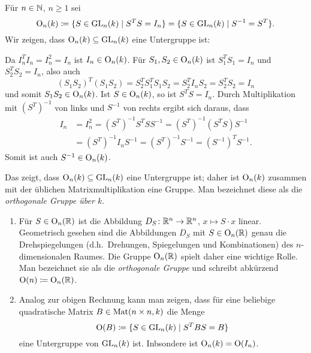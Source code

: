 Für $n \in \mathbb{N}$, $n \geq 1$ sei
\[
 \mathrm{O}_n(k)
 \coloneqq \{S \in \mathrm{GL}_n(k) \mid S^T S = I_n\}
 = \{S \in \mathrm{GL}_n(k) \mid S^{-1} = S^T\}.
\]
Wir zeigen, dass $\mathrm{O}_n(k) \subseteq \mathrm{GL}_n(k)$ eine Untergruppe ist:

Da $I_n^T I_n = I_n^2 = I_n$ ist $I_n \in \mathrm{O}_n(k)$. Für $S_1, S_2 \in \mathrm{O}_n(k)$ ist $S_1^T S_1 = I_n$ und $S_2^T S_2 = I_n$, also auch
\[
 (S_1 S_2)^T (S_1 S_2)
 = S_2^T S_1^T S_1 S_2
 = S_2^T I_n S_2
 = S_2^T S_2
 = I_n
\]
und somit $S_1 S_2 \in \mathrm{O}_n(k)$. Ist $S \in \mathrm{O}_n(k)$, so ist $S^T S = I_n$. Durch Multiplikation mit $(S^T)^{-1}$ von links und $S^{-1}$ von rechts ergibt sich daraus, dass
\begin{align*}
 I_n
 &= I_n^2
 = (S^T)^{-1} S^T S S^{-1}
 = (S^T)^{-1} (S^T S) S^{-1} \\
 &= (S^T)^{-1} I_n S^{-1}
 = (S^T)^{-1} S^{-1}
 = (S^{-1})^T S^{-1}.
\end{align*}
Somit ist auch $S^{-1} \in \mathrm{O}_n(k)$.

Das zeigt, dass $\mathrm{O}_n(k) \subseteq \mathrm{GL}_n(k)$ eine Untergruppe ist; daher ist $\mathrm{O}_n(k)$ zusammen mit der üblichen Matrixmultiplikation eine Gruppe. Man bezeichnet diese als die \emph{orthogonale Gruppe über $k$}.

\begin{bem}
 \begin{enumerate}[leftmargin=*]
  \item
   Für $S \in \mathrm{O}_n(\mathbb{R})$ ist die Abbildung $D_S \colon \mathbb{R}^n \to \mathbb{R}^n$, $x \mapsto S \cdot x$ linear. Geometrisch gesehen sind die Abbildungen $D_S$ mit $S \in \mathrm{O}_n(\mathbb{R})$ genau die Drehspiegelungen (d.h.\ Drehungen, Spiegelungen und Kombinationen) des $n$-dimensionalen Raumes. Die Gruppe $\mathrm{O}_n(\mathbb{R})$ spielt daher eine wichtige Rolle. Man bezeichnet sie als die \emph{orthogonale Gruppe} und schreibt abkürzend $\mathrm{O}(n) \coloneqq \mathrm{O}_n(\mathbb{R})$.
  \item
   Analog zur obigen Rechnung kann man zeigen, dass für eine beliebige quadratische Matrix $B \in \mathrm{Mat}(n \times n, k)$ die Menge
   \[
    \mathrm{O}(B) \coloneqq \{S \in \mathrm{GL}_n(k) \mid S^T B S = B\}
   \]
   eine Untergruppe von $\mathrm{GL}_n(k)$ ist. Inbsondere ist $\mathrm{O}_n(k) = \mathrm{O}(I_n)$.
 \end{enumerate}
\end{bem}



